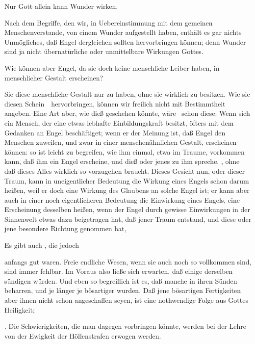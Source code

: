 \begin{aufza}
\begin{aufzb}
\item {} Nur Gott allein kann Wunder wirken.\par
{} Nach dem Begriffe, den wir, in Uebereinstimmung mit dem gemeinen Menschenverstande, von einem Wunder aufgestellt haben, enthält es gar nichts Unmögliches, daß Engel dergleichen sollten hervorbringen können; denn Wunder sind ja nicht übernatürliche oder unmittelbare Wirkungen Gottes.\par
{} Wie können aber Engel, da sie doch keine menschliche Leiber haben, in menschlicher Gestalt erscheinen?\par
{} Sie  diese menschliche Gestalt nur zu haben, ohne sie wirklich zu besitzen. Wie sie diesen Schein~\ hervorbringen, können wir freilich nicht mit Bestimmtheit angeben. Eine Art aber, wie dieß geschehen könnte, wäre \zB\ schon diese: Wenn sich ein Mensch, der eine etwas lebhafte Einbildungskraft besitzt, öfters mit dem Gedanken an Engel beschäftiget; wenn er der Meinung ist, daß Engel den Menschen zuweilen, und zwar in einer menschenähnlichen Gestalt, erscheinen können: so ist leicht zu begreifen, wie ihm einmal, etwa im Traume, vorkommen kann, daß ihm ein Engel erscheine, und dieß oder jenes zu ihm spreche, \usw , ohne daß dieses Alles wirklich so vorzugehen braucht. Dieses Gesicht nun, oder dieser Traum, kann in uneigentlicher Bedeutung die Wirkung eines Engels schon darum heißen, weil er doch eine Wirkung des Glaubens an solche Engel ist; er kann aber auch in einer noch eigentlicheren Bedeutung die Einwirkung eines Engels, eine Erscheinung desselben heißen, wenn der Engel durch gewisse Einwirkungen in der Sinnenwelt etwas dazu beigetragen hat, daß jener Traum entstand, und diese oder jene besondere Richtung genommen hat, \usw\
\end{aufzb}
\item Es gibt auch , die jedoch
\begin{aufzb}
\item anfangs gut waren. Freie endliche Wesen, wenn sie auch noch so vollkommen sind, sind immer fehlbar. Im Voraus also ließe sich erwarten, daß einige derselben sündigen würden. Und eben so begreiflich ist es, daß manche in ihren Sünden beharren, und je länger je bösartiger wurden. Daß jene bösartigen Fertigkeiten aber ihnen nicht schon angeschaffen seyen, ist eine nothwendige Folge aus Gottes Heiligkeit;
\item \RWbet{für ihre Bosheit von Gott ewig gestraft werden}. Die Schwierigkeiten, die man dagegen vorbringen könnte, werden bei der Lehre von der Ewigkeit der Höllenstrafen erwogen werden.

\end{aufzb}
\end{aufza}
